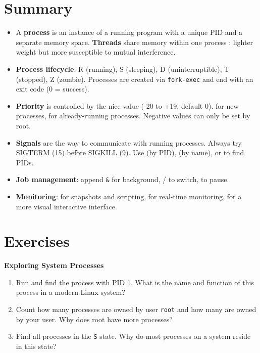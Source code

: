\section{Summary}
\label{sec:process-summary}

\begin{itemize}
  \item A \textbf{process} is an instance of a running program with a unique
    PID and a separate memory space. \textbf{Threads} share memory within one
    process : lighter weight but more susceptible to mutual interference.
  \item \textbf{Process lifecycle}: R (running), S (sleeping), D (uninterruptible),
    T (stopped), Z (zombie). Processes are created via \texttt{fork-exec} and
    end with an exit code (0 = success).
  \item \textbf{Priority} is controlled by the nice value (-20 to +19, default 0).
     for new processes,  for already-running processes.
    Negative values can only be set by root.
  \item \textbf{Signals} are the way to communicate with running processes.
    Always try SIGTERM (15) before SIGKILL (9). Use  (by PID),
     (by name), or  to find PIDs.
  \item \textbf{Job management}: append \texttt{\&} for background, /
    to switch,  to pause.
  \item \textbf{Monitoring}:  for snapshots and scripting,  for
    real-time monitoring,  for a more visual interactive interface.
\end{itemize}

\section{Exercises}
\label{sec:process-exercises}

\begin{exercisebox}[5.A]
  \textbf{Exploring System Processes}
  \begin{enumerate}
    \item Run  and find the process with PID 1. What is
      the name and function of this process in a modern Linux system?
    \item Count how many processes are owned by user \texttt{root} and how
      many are owned by your user. Why does root have more processes?
    \item Find all processes in the \texttt{S} state. Why do most processes
      on a system reside in this state?
  \end{enumerate}
\end{exercisebox}

